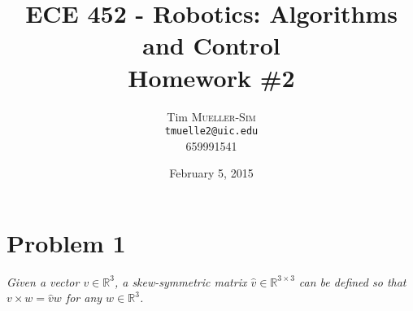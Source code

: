 \documentclass[10pt, oneside, letter]{article}
\begin{document}
\title{{\sc ECE 452} - {\sc Robotics: Algorithms and Control} \\ {\large \sc Homework \#2}}
\author{Tim \textsc{Mueller-Sim} \\ {\tt tmuelle2@uic.edu} \\ \textsc{659991541} }
\date{February 5, 2015}

\vspace{-5ex}

\maketitle 

\vspace{-5ex}
\noindent \hrulefill

\section*{Problem 1}

	\it Given a vector $v \in \mathbb{R}^{3}$, a skew-symmetric matrix $\hat{v} \in \mathbb{R}^{3 \times 3}$ can be defined so that $v \times w = \hat{v} w$ for any $w \in \mathbb{R}^{3}$.
\end{document}
